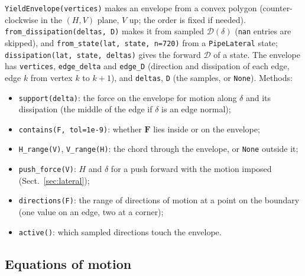 \documentclass[11pt,a4paper]{article}
\begin{document}
\texttt{YieldEnvelope(vertices)} makes an envelope from a convex
polygon (counter-clockwise in the $(H, V)$ plane, $V$ up; the order is
fixed if needed).  \texttt{from\_dissipation(deltas, D)} makes it from
sampled $\mathcal{D}(\delta)$ (\texttt{nan} entries are skipped), and
\texttt{from\_state(lat, state, n=720)} from a \texttt{PipeLateral}
state; \texttt{dissipation(lat, state, deltas)} gives the forward
$\mathcal{D}$ of a state.  The envelope has \texttt{vertices},
\texttt{edge\_delta} and \texttt{edge\_D} (direction and dissipation of
each edge, edge $k$ from vertex $k$ to $k+1$), and \texttt{deltas},
\texttt{D} (the samples, or \texttt{None}).  Methods:
\begin{itemize}
  \item \texttt{support(delta)}: the force on the envelope for motion
    along $\delta$ and its dissipation (the middle of the edge if
    $\delta$ is an edge normal);
  \item \texttt{contains(F, tol=1e-9)}: whether $\mathbf{F}$ lies
    inside or on the envelope;
  \item \texttt{H\_range(V)}, \texttt{V\_range(H)}: the chord through
    the envelope, or \texttt{None} outside it;
  \item \texttt{push\_force(V)}: $H$ and $\delta$ for a push forward
    with the motion imposed (Sect.~\ref{sec:lateral});
  \item \texttt{directions(F)}: the range of directions of motion at a
    point on the boundary (one value on an edge, two at a corner);
  \item \texttt{active()}: which sampled directions touch the envelope.
\end{itemize}

\subsection{Equations of motion}
\label{sec:motion}
\end{document}
